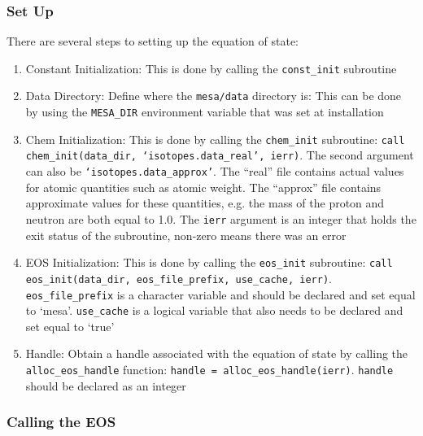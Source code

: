 \subsubsection{Set Up}

There are several steps to setting up the equation of state:
\begin{enumerate}
\item Constant Initialization: This is done by calling the {\tt const\_init} 
subroutine

\item Data Directory: Define where the {\tt mesa/data} directory is: This can 
be done by using the {\tt MESA\_DIR} environment variable that was set 
at installation

\item Chem Initialization: This is done by calling the {\tt chem\_init} 
subroutine: {\tt call chem\_init(data\_dir, `isotopes.data\_real', ierr)}. 
The second argument can also be {\tt `isotopes.data\_approx'}. The ``real'' 
file contains actual values for 
atomic quantities such as atomic weight. The ``approx'' file contains 
approximate values for these quantities, e.g. the mass of the proton and 
neutron are both equal to 1.0. The {\tt ierr} argument is an integer that 
holds the exit status of the subroutine, non-zero means there was an error

\item EOS Initialization: This is done by calling the {\tt eos\_init} 
subroutine: {\tt call eos\_init(data\_dir, eos\_file\_prefix, use\_cache, 
ierr)}. {\tt eos\_file\_prefix} is a character variable and should be 
declared and set equal to `mesa'. {\tt use\_cache} is a logical variable that 
also needs to be declared and set equal to `true'

\item Handle: Obtain a handle associated with the equation of state by 
calling the {\tt alloc\_eos\_handle} function: 
{\tt handle = alloc\_eos\_handle(ierr)}. {\tt handle} should be declared as an 
integer
\end{enumerate}

\subsubsection{Calling the EOS}

